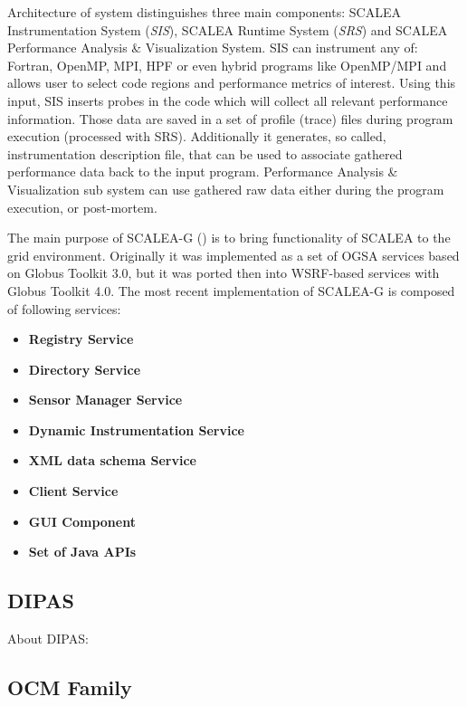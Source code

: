 Architecture of system distinguishes three main components: SCALEA Instrumentation System (\emph{SIS}), SCALEA Runtime System (\emph{SRS}) and SCALEA
Performance Analysis \& Visualization System. SIS can instrument any of: Fortran, OpenMP, MPI, HPF or even hybrid programs like OpenMP/MPI and allows user to
select code regions and performance metrics of interest. Using this input, SIS inserts probes in the code which will collect all relevant performance information. Those
data are saved in a set of profile (trace) files during program execution (processed with SRS). Additionally it generates, so called, instrumentation description file, that
can be used to associate gathered performance data back to the input program. Performance Analysis \& Visualization sub system can use gathered raw data either
during the program execution, or post-mortem.

The main purpose of SCALEA-G (\cite{SCALEA2, SCALEA3}) is to bring functionality of SCALEA to the grid environment. Originally it was implemented as a set of OGSA services based on Globus Toolkit 3.0, but it was ported then into WSRF-based services with Globus Toolkit 4.0. The most recent implementation of SCALEA-G is composed of following services:

\begin{itemize}
\item{ {\bf Registry Service}}
\item{ {\bf Directory Service}}
\item{ {\bf Sensor Manager Service}}
\item{ {\bf Dynamic Instrumentation Service}}
\item{ {\bf XML data schema Service}}
\item{ {\bf Client Service}}
\item{ {\bf GUI Component}}
\item{ {\bf Set of Java APIs}}
\end{itemize}


\subsection{DIPAS}

About DIPAS: \cite{DIPAS}

\subsection{OCM Family}

